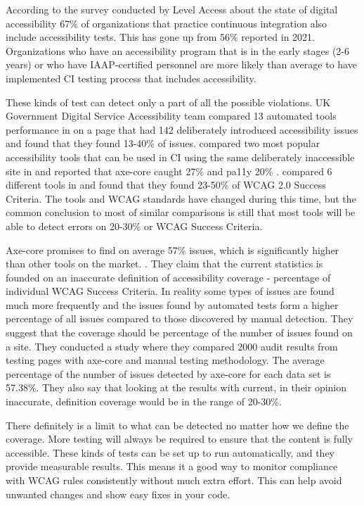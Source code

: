\documentclass{master_thesis}
\begin{document}
According to the survey conducted by Level Access about the state of digital accessibility 67\% of organizations that practice continuous integration also include accessibility tests. This has gone up from 56\% reported in 2021. Organizations who have an accessibility program that is in the early stages (2-6 years) or who have IAAP-certified personnel are more likely than average to have implemented CI testing process that includes accessibility. \citep{LevelAccess}

These kinds of test can detect only a part of all the possible violations. UK Government Digital Service Accessibility team compared 13 automated tools performance in \citeyear{GAT2018} on a page that had 142 deliberately introduced accessibility issues and found that they found 13-40\% of issues. \citeauthor{Abbott2021} compared two most popular accessibility tools that can be used in CI using the same deliberately inaccessible site in \citeyear{Abbott2021} and reported that axe-core caught 27\% and pa11y 20\% \citep{Abbott2021}. \citeauthor{Vigo2013} compared 6 different tools in \citeyear{Vigo2013} and found that they found 23-50\% of  WCAG 2.0 Success Criteria. \citep{GAT2018,Abbott2021,Vigo2013} The tools and WCAG standards have changed during this time, but the common conclusion to most of similar comparisons is still that most tools will be able to detect errors on 20-30\% or WCAG Success Criteria. 

Axe-core promises to find on average 57\% issues, which is significantly higher than other tools on the market.  \citep{Deque2023}. They claim that the current statistics is founded on an inaccurate definition of accessibility coverage - percentage of individual WCAG Success Criteria. In reality some types of issues are found much more frequently and the issues found by automated tests form a higher percentage of all issues compared to those discovered by manual detection. They suggest that the coverage should be percentage of the number of issues found on a site.  They conducted a study where they compared 2000 audit results from testing pages with axe-core and manual testing methodology. The average percentage of the number of issues detected by axe-core for each data set is 57.38\%. They also say that looking at the results with current, in their opinion inaccurate, definition coverage would be in the range of 20-30\%. \citep{DequeSystems2021report}

There definitely is a limit to what can be detected no matter how we define the coverage. More testing will always be required to ensure that the content is fully accessible. These kinds of tests can be set up to run automatically, and they provide measurable results. This means it a good way to monitor compliance with WCAG rules consistently without much extra effort. This can help avoid unwanted changes and show easy fixes in  your code.

\end{document}
